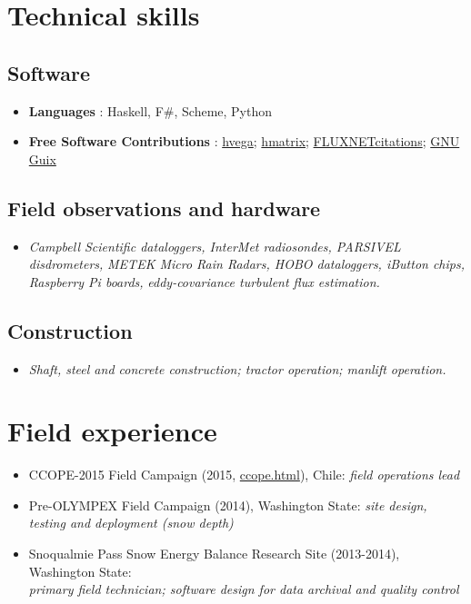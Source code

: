 \documentclass[letterpaper]{article}
\begin{document}
\section{Technical skills}
\label{sec:orgf5d7790}

\subsection{Software}
\label{sec:org363bbc4}
\begin{itemize}
\item \textbf{Languages} : Haskell, F\#, Scheme, Python
\item \textbf{Free Software Contributions} : \href{https://github.com/DougBurke/hvega}{hvega};  \href{https://github.com/haskell-numerics/hmatrix}{hmatrix}; \href{https://github.com/trevorkeenan/FLUXNET\_citations}{FLUXNETcitations}; \href{https://www.gnu.org/software/guix/}{GNU Guix}
\end{itemize}

\subsection{Field observations and hardware}
\label{sec:orgad8ef21}
\begin{itemize}
\item \emph{Campbell Scientific dataloggers, InterMet radiosondes, PARSIVEL disdrometers,}
  \emph{METEK Micro Rain Radars, HOBO dataloggers, iButton chips, Raspberry Pi boards,}
  \emph{eddy-covariance turbulent flux estimation.}
\end{itemize}
\subsection{Construction}
\label{sec:org208f43c}
\begin{itemize}
\item \emph{Shaft, steel and concrete construction; tractor operation; manlift operation.}
\end{itemize}

\newpage

\section{Field experience}
\label{sec:org1dedf6e}
\begin{itemize}
\item CCOPE-2015 Field Campaign (2015, \href{http://www.atmos.albany.edu/student/massmann/ccope.html}{ccope.html}), Chile: \emph{field operations lead}
\item Pre-OLYMPEX Field Campaign (2014), Washington State: \emph{site
    design, testing and deployment (snow depth)}
\item Snoqualmie Pass Snow Energy Balance Research Site (2013-2014),
  Washington State: \\
  \emph{primary field technician; software design
    for data archival and quality control}
\end{itemize}
\end{document}
